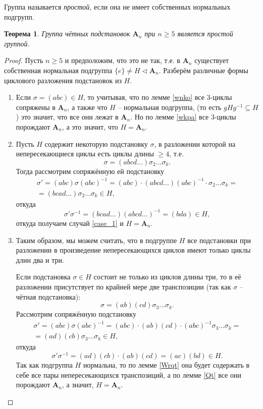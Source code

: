 \documentclass{article}
\newtheorem{theorem}{Теорема}[section]
\begin{document}
Группа называется \textit{простой}, если она не имеет собственных нормальных подгрупп.

\begin{theorem}
    Группа чётных подстановок $\mathbf{A}_n$ при $n \geqslant 5$ является простой группой.
\end{theorem}
\begin{proof}
    Пусть $n \geqslant 5$ и предположим, что это не так, т.е. в $\mathbf{A}_n$ существует собственная нормальная подгруппа $\{ e \} \neq H \triangleleft \mathbf{A}_n$.
    Разберём различные формы циклового разложения подстановок из $H$.

    \begin{enumerate}
        \item \label{case_1} Если $\sigma = (abc) \in H$, то учитывая, что по лемме \ref{wnko} все 3-циклы сопряжены в $\mathbf{A}_n$, а также что $H$ -- нормальная подгруппа, (то есть $gHg^{-1} \subseteq H$) это значит, что все они лежат в $\mathbf{A}_n$. Но по лемме \ref{wkpa} все 3-циклы порождают $\mathbf{A}_n$, а это значит, что $H = \mathbf{A}_n$.
        
        \item \label{case_2} Пусть $H$ содержит некоторую подстановку $\sigma$, в разложении которой на непересекающиеся циклы есть циклы длины $\geqslant 4$, т.е. $$\sigma = (abcd\ldots)\sigma_2 \ldots \sigma_k.$$ Тогда рассмотрим сопряжённую ей подстановку
        \begin{multline*}
            \sigma' = (abc) \sigma (abc)^{-1} = (abc) \cdot (abcd\ldots)(abc)^{-1} \cdot \sigma_2 \ldots \sigma_k = \\
            = (bcad\ldots)\sigma_2 \ldots \sigma_k \in H,
        \end{multline*}
        откуда $$ \sigma' \sigma^{-1} = (bcad\ldots)(abcd\ldots)^{-1} = (bda) \in H, $$ откуда получаем случай \ref{case_1} и $H = \mathbf{A}_n$.
        
        \item Таким образом, мы можем считать, что в подгруппе $H$ все подстановки при разложении в произведение непересекающихся циклов имеют только циклы длин два и три.

        Если подстановка $\sigma \in H$ состоит не только из циклов длины три, то в её разложении присутствует по крайней мере две транспозиции (так как $\sigma$ -- чётная подстановка): $$ \sigma = (ab)(cd)\sigma_3 \ldots \sigma_k. $$
        Рассмотрим сопряжённую подстановку
        \begin{multline*}
            \sigma' = (abc)\sigma(abc)^{-1} = (abc) \cdot (ab)(cd) \cdot (abc)^{-1} \sigma_3 \ldots \sigma_k = \\
            = (ad)(cb)\sigma_3 \ldots \sigma_k \in H,
        \end{multline*}
        откуда $$ \sigma' \sigma^{-1} = (ad)(cb) \cdot (ab)(cd) = (ac)(bd) \in H. $$
        Так как подгруппа $H$ нормальна, то по лемме \ref{Wrqt} она будет содержать в себе все пары непересекающихся транспозиций, а по лемме \ref{Qt} все они порождают $\mathbf{A}_n$, а значит, $H = \mathbf{A}_n$.


\end{enumerate}
\end{proof}
\end{document}
